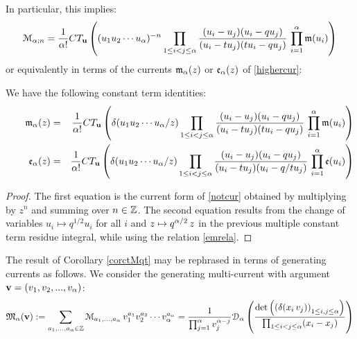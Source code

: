 In particular, this implies:
\begin{equation}\label{notcur}
{\mathcal M}_{{\alpha};n}=\frac{1}{{\alpha}!}CT_{\mathbf u}\left( (u_1 u_2 \cdots u_{\alpha})^{-n} \prod_{1\leq i<j\leq {\alpha}} \frac{(u_i-u_j)
(u_i-q u_j)}{(u_i-t u_j)(t u_i-q u_j)}
\, \prod_{i=1}^{\alpha} {\mathfrak m}(u_i)\right)
\end{equation}
or equivalently in terms of the currents ${\mathfrak m}_{\alpha}(z)$ or ${\mathfrak e}_{\alpha}(z)$
of \eqref{highercur}:
\begin{cor}\label{ealine}
We have the following constant term identities:
\begin{eqnarray}
\qquad {\mathfrak m}_{{\alpha}}(z)&=&\frac{1}{{\alpha}!}CT_{\mathbf u}\left( \delta(u_1 u_2 \cdots u_{\alpha}/z)\prod_{1\leq i<j\leq {\alpha}} \frac{(u_i-u_j)
(u_i-q u_j)}{(u_i-t u_j)(t u_i-q u_j)}
\, \prod_{i=1}^{\alpha} {\mathfrak m}(u_i)\right)\\
\qquad {\mathfrak e}_{{\alpha}}(z)&=&\frac{1}{{\alpha}!}CT_{\mathbf u}\left( \delta(u_1 u_2 \cdots u_{\alpha}/z)\prod_{1\leq i<j\leq {\alpha}} \frac{(u_i-u_j)
(u_i-q u_j)}{(u_i-t u_j)(u_i-q/t u_j)}
\, \prod_{i=1}^{\alpha} {\mathfrak e}(u_i)\right)
\end{eqnarray}
\end{cor}
\begin{proof} The first equation is the current form of \eqref{notcur} obtained by multiplying by $z^n$ 
and summing over $n\in {\mathbb Z}$.
The second equation results from the change of variables $u_i\mapsto q^{1/2} u_i$ for all $i$ and
$z\mapsto q^{{\alpha}/2} \, z$ in the previous multiple 
constant term residue integral, while using the relation \eqref{emrela}.
\end{proof}



The result of Corollary \ref{corctMqt} may be rephrased in terms of generating currents as follows.
We consider the generating multi-current with argument ${\mathbf v}=(v_1,v_2,...,v_{\alpha})$:
\begin{equation}\label{defMal}
{\mathfrak M}_{\alpha}({\mathbf v}):=\sum_{a_1,...,a_{\alpha}\in {\mathbb Z}} {\mathcal M}_{a_1,...,a_{\alpha}}\, v_1^{a_1}v_2^{a_2}\cdots v_{{\alpha}}^{a_{\alpha}}=
 \frac{1}{\prod_{j=1}^{\alpha} v_j^{{\alpha}-j}}{\mathcal D}_{\alpha} \left(\frac{\det\left(\left( \delta(x_i \, v_j) \right)_{1\leq i,j\leq {\alpha}}\right)}{\prod_{1\leq i<j\leq {\alpha}}(x_i-x_j)} \right)
\end{equation}

